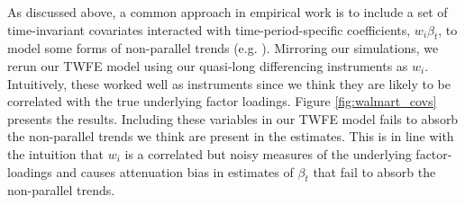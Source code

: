 \documentclass[12pt]{article}
\begin{document}
As discussed above, a common approach in empirical work is to include a set of time-invariant covariates interacted with time-period-specific coefficients, $w_i \beta_t$, to model some forms of non-parallel trends (e.g. \citet{abadie2005semiparametric, sant2020doubly}). Mirroring our simulations, we rerun our TWFE model using our quasi-long differencing instruments as $w_i$. Intuitively, these worked well as instruments since we think they are likely to be correlated with the true underlying factor loadings. Figure \ref{fig:walmart_covs} presents the results. Including these variables in our TWFE model fails to absorb the non-parallel trends we think are present in the estimates. This is in line with the intuition that $w_i$ is a correlated but noisy measures of the underlying factor-loadings and causes attenuation bias in estimates of $\beta_t$ that fail to absorb the non-parallel trends. 
\end{document}
